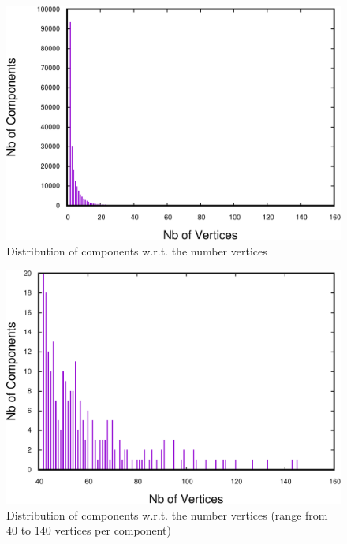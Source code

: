\begin{figure}
\centering
\includegraphics[scale=0.35]{bench/frequencyall-crop.pdf}
\caption{Distribution of components w.r.t. the number vertices}
\label{fig:vertices-components-all}
\end{figure}

\begin{figure}
\centering
\includegraphics[scale=0.35]{bench/frequency-selected-crop.pdf}
\caption{Distribution of components w.r.t. the number vertices (range from 40 to 140 vertices per component)}
\label{fig:vertices-components-all}
\end{figure}


